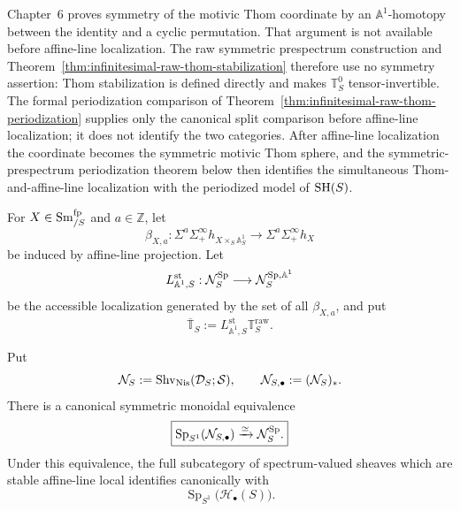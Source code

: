 \begin{remark}
\label{rem:infinitesimal-raw-thom-symmetry-postponed}
Chapter~6 proves symmetry of the motivic Thom coordinate by an
\(\mathbb A^1\)-homotopy between the identity and a cyclic permutation.  That
argument is not available before affine-line localization.  The raw symmetric
prespectrum construction and
Theorem~\ref{thm:infinitesimal-raw-thom-stabilization} therefore use no
symmetry assertion: Thom stabilization is defined directly and makes
\(\mathbb T_S^0\) tensor-invertible.  The formal periodization comparison of
Theorem~\ref{thm:infinitesimal-raw-thom-periodization} supplies only the
canonical split comparison before affine-line localization; it does not
identify the two categories.  After affine-line localization the coordinate
becomes the symmetric motivic Thom sphere, and the symmetric-prespectrum
periodization theorem below then identifies the simultaneous
Thom-and-affine-line localization with the periodized model of \(\mathrm{SH}(S)\).
\end{remark}

\begin{definition}
\label{def:infinitesimal-stable-a1-localization}
For $X\in\operatorname{Sm}^{\mathrm{fp}}_{/S}$ and $a\in\mathbb Z$, let
\[
    \beta_{X,a}:
    \Sigma^a\Sigma^\infty_+h_{X\times_S\mathbb A^1_S}
    \longrightarrow
    \Sigma^a\Sigma^\infty_+h_X
\]
be induced by affine-line projection.  Let
\[
    L^{\mathrm{st}}_{\mathbb A^1,S}:
    \mathcal N_S^{\mathrm{Sp}}
    \longrightarrow
    \mathcal N_S^{\mathrm{Sp},\mathbb A^1}
\]
be the accessible localization generated by the set of all $\beta_{X,a}$,
and put
\[
    \overline{\mathbb T}_S
    :=
    L^{\mathrm{st}}_{\mathbb A^1,S}\mathbb T_S^{\mathrm{raw}}.
\]
\end{definition}

\begin{lemma}
\label{lem:infinitesimal-spectrum-sheaf-interchange}
Put
\[
    \mathcal N_S
    :=
    \operatorname{Shv}_{\mathrm{Nis}}(\mathcal D_S;\mathcal S),
    \qquad
    \mathcal N_{S,\bullet}:=(\mathcal N_S)_*.
\]
There is a canonical symmetric monoidal equivalence
\[
    \boxed{
    \operatorname{Sp}_{S^1}(\mathcal N_{S,\bullet})
    \xrightarrow{\simeq}
    \mathcal N_S^{\mathrm{Sp}}.
    }
\]
Under this equivalence, the full subcategory of spectrum-valued sheaves which
are stable affine-line local identifies canonically with
\[
    \operatorname{Sp}_{S^1}\bigl(\mathcal H_\bullet(S)\bigr).
\]
\end{lemma}


